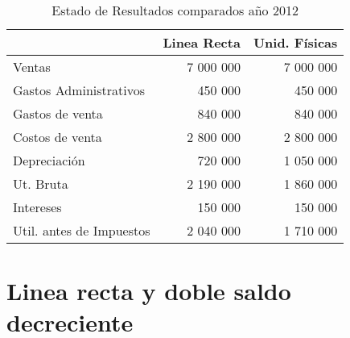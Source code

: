 \documentclass[10pt,a4paper]{report}
\begin{document}
\begin{table}[h!]
\centering
\caption{Estado de Resultados comparados año 2012}
\begin{tabular}{l|r|r} 
                          & Linea Recta & Unid. Físicas \\ \hline
 Ventas                   & 7 000 000   & 7 000 000     \\
 Gastos Administrativos   & 450 000     & 450 000       \\
 Gastos de venta          & 840 000     & 840 000       \\
 Costos de venta          & 2 800 000   & 2 800 000     \\
 Depreciación             & 720 000     & 1 050 000     \\ \hline
 Ut. Bruta                & 2 190 000   & 1 860 000     \\
 Intereses                & 150 000     & 150 000       \\ \hline
 Util. antes de Impuestos & 2 040 000   & 1 710 000
 
\end{tabular}

\end{table}

\newpage	%

\section{Linea recta y doble saldo decreciente}
	 
	
	
\end{document}
